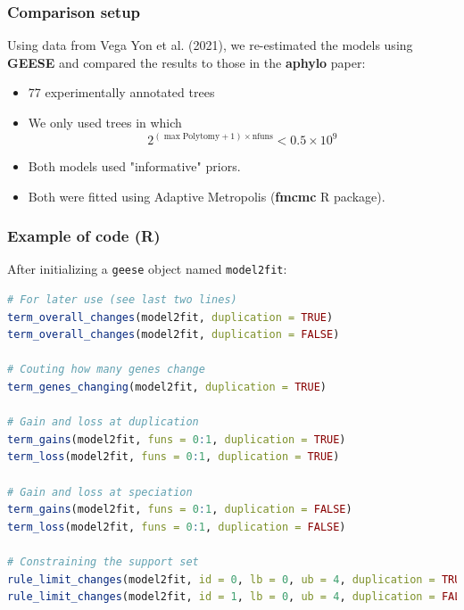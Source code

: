 \documentclass[aspectratio=169, 9pt]{beamer}
\begin{document}
\begin{frame}
	\frametitle{Comparison setup}
	Using data from Vega Yon et al. (2021), we re-estimated the models using \textbf{GEESE} and compared the results to those in the \textbf{aphylo} paper:
	
	\begin{itemize}
		\item<2-> 77 experimentally annotated trees
		\item<3-> We only used trees in which 
		$$2^{(\max{\mbox{Polytomy}} + 1)\times \mbox{nfuns}}< 0.5\times 10^9$$
		\noindent\uncover<4->{i.e., half billion}
		\item<5-> Both models used "informative" priors.
		\item<6-> Both were fitted using Adaptive Metropolis (\textbf{fmcmc} R package).
	\end{itemize}
\end{frame}

\begin{frame}[fragile]
	\frametitle{Example of code (R)}
	
After initializing a \texttt{geese} object named \texttt{model2fit}:\pause
	
\begin{lstlisting}[language=R] 
# For later use (see last two lines)
term_overall_changes(model2fit, duplication = TRUE)
term_overall_changes(model2fit, duplication = FALSE)

# Couting how many genes change
term_genes_changing(model2fit, duplication = TRUE)

# Gain and loss at duplication
term_gains(model2fit, funs = 0:1, duplication = TRUE)
term_loss(model2fit, funs = 0:1, duplication = TRUE)

# Gain and loss at speciation
term_gains(model2fit, funs = 0:1, duplication = FALSE)
term_loss(model2fit, funs = 0:1, duplication = FALSE)

# Constraining the support set
rule_limit_changes(model2fit, id = 0, lb = 0, ub = 4, duplication = TRUE)
rule_limit_changes(model2fit, id = 1, lb = 0, ub = 4, duplication = FALSE)
\end{lstlisting}
	
\end{frame}
\end{document}
